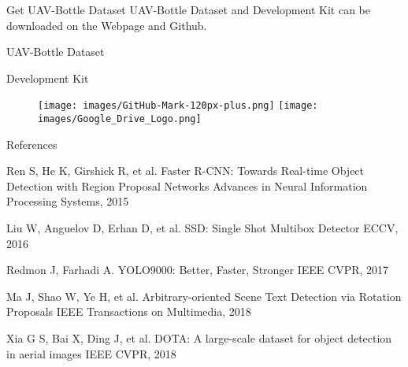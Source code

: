 \documentclass[newPxFont, fullfooter, sectionpages, progressbar]{beamer}
\begin{document}

\begin{frame}[c]{Get UAV-Bottle Dataset}
	\vspace{10mm}
	UAV-Bottle Dataset and Development Kit can be downloaded on the Webpage and Github. \\
\vspace{1em}
\begin{center}
	\large{UAV-Bottle Dataset}

	\large{Development Kit}
	\vspace{1.5em}

	\begin{figure}
		\centerline{
			\texttt{[image: images/GitHub-Mark-120px-plus.png]}
			\hspace{1.5cm}
			\texttt{[image: images/Google\_Drive\_Logo.png]}
			}
	\end{figure}
	
\end{center}
\end{frame}



\begin{frame}{References}
	\begin{thebibliography}{10}
	\scriptsize
	
	
	\beamertemplatearticlebibitems
	Ren S, He K, Girshick R, et al.
	\newblock Faster R-CNN: Towards Real-time Object Detection with Region Proposal Networks
	\newblock Advances in Neural Information Processing Systems, 2015
	
	\beamertemplatearticlebibitems
	Liu W, Anguelov D, Erhan D, et al.
	\newblock SSD: Single Shot Multibox Detector
	\newblock ECCV, 2016
	
	\beamertemplatearticlebibitems
	Redmon J, Farhadi A.
	\newblock YOLO9000: Better, Faster, Stronger
	\newblock IEEE CVPR, 2017

	\beamertemplatearticlebibitems
	Ma J, Shao W, Ye H, et al.
	\newblock Arbitrary-oriented Scene Text Detection via Rotation Proposals
	\newblock IEEE Transactions on Multimedia, 2018
	

	\beamertemplatearticlebibitems
	Xia G S, Bai X, Ding J, et al.
	\newblock DOTA: A large-scale dataset for object detection in aerial images
	\newblock IEEE CVPR, 2018
	
	
  \end{thebibliography}
\end{frame}

\begingroup
{}
\begin{frame}[plain]
\vspace{1.4cm}

\end{frame}
\endgroup
\end{document}
